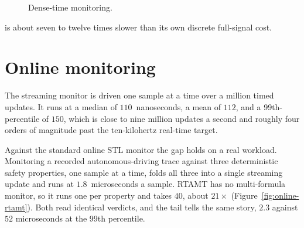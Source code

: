 \begin{figure}[h]
\centering
\begin{widefig}\end{widefig}
\caption{Dense-time monitoring.}
\label{fig:dense}
\end{figure}

\sentil{} is about seven to twelve times slower than its own discrete full-signal cost.

\section{Online monitoring}

The streaming monitor is driven one sample at a time over a million timed updates. It runs at a median of $110$~nanoseconds, a mean of $112$, and a 99th-percentile of $150$, which is close to nine million updates a second and roughly four orders of magnitude past the ten-kilohertz real-time target.

Against the standard online STL monitor the gap holds on a real workload. Monitoring a recorded autonomous-driving trace against three deterministic safety properties, one sample at a time, \sentil{} folds all three into a single streaming update and runs at $1.8$~microseconds a sample. RTAMT has no multi-formula monitor, so it runs one per property and takes $40$, about $21\times$ (Figure~\ref{fig:online-rtamt}). Both read identical verdicts, and the tail tells the same story, $2.3$ against $52$ microseconds at the 99th percentile.

